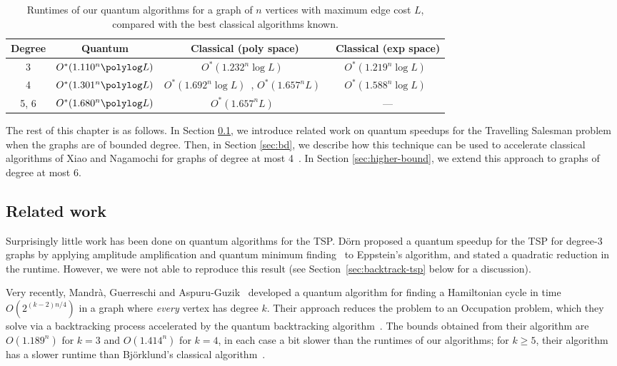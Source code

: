 \begin{table}
\begin{center}
\begin{tabularx}{\textwidth}{|c|c|C|c|}
\hline Degree & Quantum & Classical (poly space) & Classical (exp space) \\
 & $O^*(1.110^n \polylog L)$ & $O^*(1.232^n\log L)$~\cite{xiao2016degree3} & $O^*(1.219^n\log L)$~\cite{bodlaender15} \\
 4 & $O^*(1.301^n \polylog L)$ & $O^*(1.692^n\log L)$~\cite{xiao2016degree4}, $O^*(1.657^n L)$~\cite{bjorklund14} & $O^*(1.588^n\log L)$~\cite{cygan11}\\
 5, 6 & $O^*(1.680^n \polylog L)$ & $O^*(1.657^n L)$~\cite{bjorklund14} & --- \\
\hline
\end{tabularx}
\end{center}
\caption[Runtimes of our quantum algorithms for the Travelling Salesman Problem]{Runtimes of our quantum algorithms for a graph of $n$ vertices with maximum edge cost $L$, compared with the best classical algorithms known.}
\label{tab:summary}
\end{table}

The rest of this chapter is as follows. In Section \ref{sec:tsp-related}, we introduce related work on quantum speedups for the Travelling Salesman problem when the graphs are of bounded degree. Then, in Section \ref{sec:bd}, we describe how this technique can be used to accelerate classical algorithms of Xiao and Nagamochi for graphs of degree at most 4~\cite{xiao2016degree3,xiao2016degree4}. In Section \ref{sec:higher-bound}, we extend this approach to graphs of degree at most 6.

\subsection{Related work}
\label{sec:tsp-related}

Surprisingly little work has been done on quantum algorithms for the TSP. D\"orn \cite{dorn2007} proposed a quantum speedup for the TSP for degree-3 graphs by applying amplitude amplification \cite{brassard1997} and quantum minimum finding~\cite{durr1996} to Eppstein's algorithm, and stated a quadratic reduction in the runtime. However, we were not able to reproduce this result (see Section~\ref{sec:backtrack-tsp} below for a discussion).

Very recently, Mandr{\`a}, Guerreschi and Aspuru-Guzik~\cite{mandra2016} developed a quantum algorithm for finding a Hamiltonian cycle in time $O(2^{(k-2)n/4})$ in a graph where {\em every} vertex has degree $k$. Their approach reduces the problem to an Occupation problem, which they solve via a backtracking process accelerated by the quantum backtracking algorithm~\cite{montanaro2015}. The bounds obtained from their algorithm are $O(1.189^n)$ for $k = 3$ and $O(1.414^n)$ for $k=4$, in each case a bit slower than the runtimes of our algorithms; for $k \ge 5$, their algorithm has a slower runtime than Bj\"orklund's classical algorithm~\cite{bjorklund14}.

